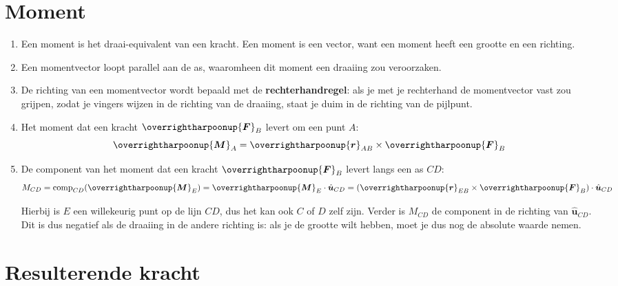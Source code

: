\documentclass{article}
\renewcommand{\v}[1]{\overrightharpoonup{\bm{#1}}}
\renewcommand{\u}[1]{\hat{\bm{#1}}}
\newcommand{\F}{\v{F}}
\newcommand{\M}{\v{M}}
\renewcommand{\r}{\v{r}}
\begin{document}
\section{Moment}
\label{moment}

\begin{enumerate} 

\item Een moment is het draai-equivalent van een kracht. Een moment is een vector, want een moment heeft een grootte en een richting.

\item Een momentvector loopt parallel aan de as, waaromheen dit moment een draaiing zou veroorzaken.

\item De richting van een momentvector wordt bepaald met de \textbf{rechterhandregel}: als je met je rechterhand de momentvector vast zou grijpen, zodat je vingers wijzen in de richting van de draaiing, staat je duim in de richting van de pijlpunt.

\item Het moment dat een kracht $\F_B$ levert om een punt $A$:
$$\M_A = \r_{A B} \times \F_B$$

\item De component van het moment dat een kracht $\F_B$ levert langs een as $CD$:
$$M_{CD} = \text{comp}_{CD}(\M_E) = \M_E\cdot \u{u}_{C D}=(\r_{EB} \times \F_B)\cdot \u{u}_{C D}$$ 

Hierbij is $E$ een willekeurig punt op de lijn $CD$, dus het kan ook $C$ of $D$ zelf zijn. Verder is $M_{CD}$ de component in de richting van $\u{u}_{CD}$. Dit is dus negatief als de draaiing in de andere richting is: als je de grootte wilt hebben, moet je dus nog de absolute waarde nemen.
\end{enumerate}

\section{Resulterende kracht}
\label{res}
\end{document}
